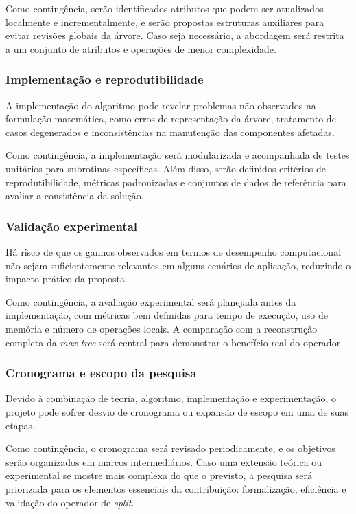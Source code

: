 Como contingência, serão identificados atributos que 
podem ser atualizados localmente e 
incrementalmente, e serão propostas estruturas 
auxiliares para evitar revisões globais da 
árvore. Caso seja necessário, a abordagem será 
restrita a um conjunto de atributos e operações de 
menor complexidade.

\subsubsection{Implementação e reprodutibilidade}

A implementação do algoritmo pode revelar problemas 
não observados na formulação matemática, 
como erros de representação da árvore, 
tratamento de casos degenerados e inconsistências 
na manutenção das componentes afetadas.

Como contingência, a implementação será modularizada 
e acompanhada de testes unitários para 
subrotinas específicas. Além disso, serão definidos 
critérios de reprodutibilidade, 
métricas padronizadas e conjuntos de dados de 
referência para avaliar a consistência da solução.

\subsubsection{Validação experimental}

Há risco de que os ganhos observados em termos de 
desempenho computacional não sejam suficientemente 
relevantes em alguns cenários de aplicação, 
reduzindo o impacto prático da proposta.

Como contingência, a avaliação 
experimental será planejada antes da 
implementação, com métricas bem definidas para 
tempo de execução, uso de memória e número de 
operações locais. A comparação com a reconstrução 
completa da \textit{max tree} será central para 
demonstrar o benefício real do operador.

\subsubsection{Cronograma e escopo da pesquisa}

Devido à combinação de teoria, algoritmo, implementação e 
experimentação, o projeto pode sofrer desvio de 
cronograma ou expansão de escopo em uma de suas etapas.

Como contingência, o cronograma será revisado 
periodicamente, e os objetivos serão organizados em 
marcos intermediários. Caso uma extensão teórica ou 
experimental se mostre mais complexa do que o previsto, 
a pesquisa será priorizada para os elementos essenciais 
da contribuição: formalização, eficiência e validação 
do operador de \textit{split}.

